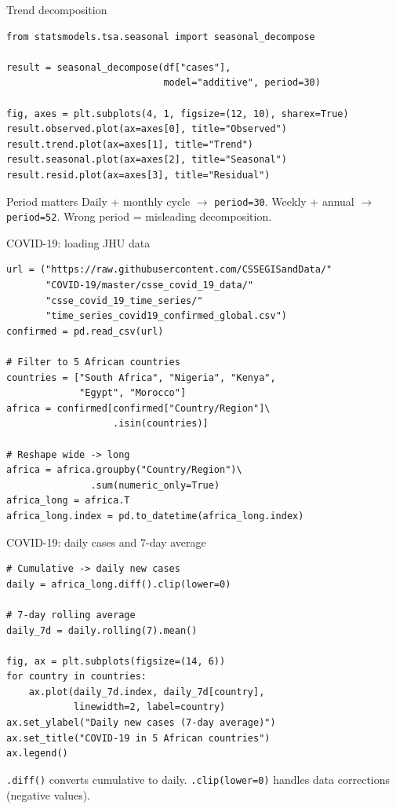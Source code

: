 \documentclass[aspectratio=169,11pt]{beamer}
\begin{document}
\begin{frame}[fragile]{Trend decomposition}
\begin{verbatim}
from statsmodels.tsa.seasonal import seasonal_decompose

result = seasonal_decompose(df["cases"],
                            model="additive", period=30)

fig, axes = plt.subplots(4, 1, figsize=(12, 10), sharex=True)
result.observed.plot(ax=axes[0], title="Observed")
result.trend.plot(ax=axes[1], title="Trend")
result.seasonal.plot(ax=axes[2], title="Seasonal")
result.resid.plot(ax=axes[3], title="Residual")
\end{verbatim}

\begin{alertblock}{Period matters}
Daily + monthly cycle $\to$ \texttt{period=30}. Weekly + annual $\to$ \texttt{period=52}. Wrong period = misleading decomposition.
\end{alertblock}
\end{frame}

\begin{frame}[fragile]{COVID-19: loading JHU data}
\begin{verbatim}
url = ("https://raw.githubusercontent.com/CSSEGISandData/"
       "COVID-19/master/csse_covid_19_data/"
       "csse_covid_19_time_series/"
       "time_series_covid19_confirmed_global.csv")
confirmed = pd.read_csv(url)

# Filter to 5 African countries
countries = ["South Africa", "Nigeria", "Kenya",
             "Egypt", "Morocco"]
africa = confirmed[confirmed["Country/Region"]\
                   .isin(countries)]

# Reshape wide -> long
africa = africa.groupby("Country/Region")\
               .sum(numeric_only=True)
africa_long = africa.T
africa_long.index = pd.to_datetime(africa_long.index)
\end{verbatim}
\end{frame}

\begin{frame}[fragile]{COVID-19: daily cases and 7-day average}
\begin{verbatim}
# Cumulative -> daily new cases
daily = africa_long.diff().clip(lower=0)

# 7-day rolling average
daily_7d = daily.rolling(7).mean()

fig, ax = plt.subplots(figsize=(14, 6))
for country in countries:
    ax.plot(daily_7d.index, daily_7d[country],
            linewidth=2, label=country)
ax.set_ylabel("Daily new cases (7-day average)")
ax.set_title("COVID-19 in 5 African countries")
ax.legend()
\end{verbatim}

\texttt{.diff()} converts cumulative to daily. \texttt{.clip(lower=0)} handles data corrections (negative values).
\end{frame}
\end{document}
